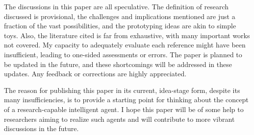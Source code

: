The discussions in this paper are all speculative. The definition of research discussed is provisional, the challenges and implications mentioned are just a fraction of the vast possibilities, and the prototyping ideas are akin to simple toys. Also, the literature cited is far from exhaustive, with many important works not covered. My capacity to adequately evaluate each reference might have been insufficient, leading to one-sided assessments or errors. The paper is planned to be updated in the future, and these shortcomings will be addressed in these updates. Any feedback or corrections are highly appreciated.

The reason for publishing this paper in its current, idea-stage form, despite its many insufficiencies, is to provide a starting point for thinking about the concept of a research-capable intelligent agent. I hope this paper will be of some help to researchers aiming to realize such agents and will contribute to more vibrant discussions in the future.



